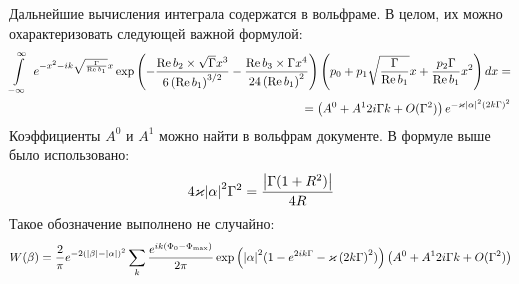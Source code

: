 \documentclass[a4paper, 12pt]{article}
\DeclareMathOperator*{\Real}{Re}
\newenvironment{eqw}{\begin{equation} \begin{aligned}}   
    {\end{aligned}    \end{equation}}
\begin{document}
Дальнейшие вычисления интеграла содержатся в вольфраме. В целом, их можно охарактеризовать следующей важной формулой:
\begin{eqw}
    \int\limits_{-\infty}^{\infty}\
    e^{-x^2 - ik\sqrt{\frac{\Gamma}{\Real b_1}}x} \exp\left(-\frac{\Real b_2 \times\sqrt{\Gamma} x^3}{6\left(\Real b_1\right)^{3/2}} - \frac{\Real b_3\times \Gamma x^4}{24\left(\Real b_1\right)^{2}} \right)
    \left(p_0 + p_1\sqrt{\frac{\Gamma}{\Real b_1}}x +\frac{p_2\Gamma}{\Real b_1}x^2\right) dx = \\
    = \left(A^0 + A^1 2i\Gamma k + O(\Gamma^2)\right) e^{-\varkappa \abs{\alpha}^2 \left(2k{\Gamma}\right)^2}
\end{eqw}
Коэффициенты $A^0$ и $A^1$ можно найти в вольфрам документе. В формуле выше было использовано:
\begin{eqw}
    4\varkappa \abs{\alpha}^2\Gamma^2 = \frac{\abs{\Gamma (1+R^2)}}{4R}
\end{eqw}
Такое обозначение выполнено не случайно:
\begin{eqw}
     W(\beta) = \frac{2}{\pi}e^{-2\left(\abs{\beta} - \abs{\alpha}\right)^2}
     \sum\limits_k \frac{e^{ik\left(\Phi_0-\Phi_{\max}\right)}}{2\pi}
     \exp\left(\abs{\alpha}^2 (1-e^{2ik\Gamma}-\varkappa \left(2k{\Gamma}\right)^2)\right) \left(A^0 + A^1 2i\Gamma k + O(\Gamma^2)\right)
\end{eqw}
\end{document}
